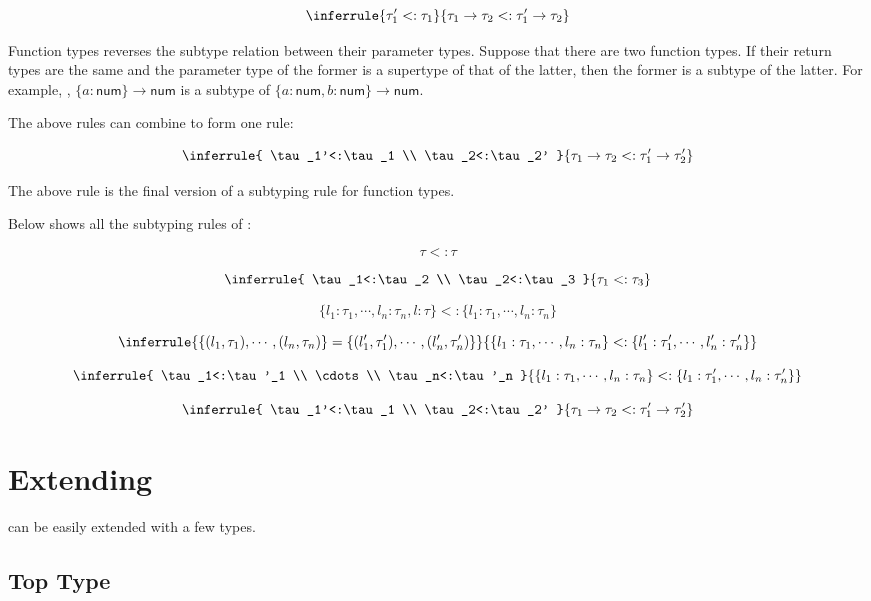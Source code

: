 \[
\inferrule
{ \tau_1'<:\tau_1 }
{ \tau_1\rightarrow\tau_2<:\tau_1'\rightarrow\tau_2 }
\]

Function types reverses the subtype relation between their parameter types.
Suppose that there are two function types. If their return types are the same
and the parameter type of the former is a supertype of that of the latter, then
the former is a subtype of the latter. For example, , \(\{a:\textsf{
num}\}\rightarrow\textsf{num}\) is a subtype of \(\{a:\textsf{num},b:\textsf{
num}\}\rightarrow\textsf{num}\).

The above rules can combine to form one rule:

\[
\inferrule
{ \tau_1'<:\tau_1 \\ \tau_2<:\tau_2' }
{ \tau_1\rightarrow\tau_2<:\tau_1'\rightarrow\tau_2' }
\]

The above rule is the final version of a subtyping rule for function types.

Below shows all the subtyping rules of \lang:

\[\tau<:\tau\]

\[
\inferrule
{ \tau_1<:\tau_2 \\ \tau_2<:\tau_3 }
{ \tau_1<:\tau_3 }
\]

\[
\{l_1:\tau_1,\cdots,l_n:\tau_n,l:\tau\}<:\{l_1:\tau_1,\cdots,l_n:\tau_n\}
\]

\[
\inferrule
{ \{(l_1,\tau_1),\cdots,(l_n,\tau_n)\}=\{(l'_1,\tau'_1),\cdots,(l'_n,\tau'_n)\} }
{ \{l_1:\tau_1,\cdots,l_n:\tau_n\}<:\{l'_1:\tau'_1,\cdots,l'_n:\tau'_n\} }
\]

\[
\inferrule
{ \tau_1<:\tau'_1 \\ \cdots \\ \tau_n<:\tau'_n }
{ \{l_1:\tau_1,\cdots,l_n:\tau_n\}<:\{l_1:\tau'_1,\cdots,l_n:\tau'_n\} }
\]

\[
\inferrule
{ \tau_1'<:\tau_1 \\ \tau_2<:\tau_2' }
{ \tau_1\rightarrow\tau_2<:\tau_1'\rightarrow\tau_2' }
\]

\section{Extending \lang}

\lang can be easily extended with a few types.

\subsection{Top Type}

